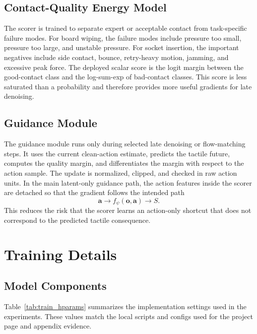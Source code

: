 \documentclass[10pt,letterpaper]{article}
\newcommand{\action}{\mathbf{a}}
\newcommand{\obs}{\mathbf{o}}
\newcommand{\score}{S}
\begin{document}
\subsection{Contact-Quality Energy Model}

The scorer is trained to separate expert or acceptable contact from
task-specific failure modes. For board wiping, the failure modes include
pressure too small, pressure too large, and unstable pressure. For socket
insertion, the important negatives include side contact, bounce, retry-heavy
motion, jamming, and excessive peak force. The deployed scalar score is the
logit margin between the good-contact class and the log-sum-exp of bad-contact
classes. This score is less saturated than a probability and therefore provides
more useful gradients for late denoising.

\subsection{Guidance Module}

The guidance module runs only during selected late denoising or flow-matching
steps. It uses the current clean-action estimate, predicts the tactile future,
computes the quality margin, and differentiates the margin with respect to the
action sample. The update is normalized, clipped, and checked in raw action
units. In the main latent-only guidance path, the action features inside the
scorer are detached so that the gradient follows the intended path
\[
\action \rightarrow f_\psi(\obs,\action) \rightarrow \score.
\]
This reduces the risk that the scorer learns an action-only shortcut that does
not correspond to the predicted tactile consequence.

\section{Training Details}
\label{sec:training}

\subsection{Model Components}

Table~\ref{tab:train_hparams} summarizes the implementation settings used in
the experiments. These values match the local scripts and configs used
for the project page and appendix evidence.
\end{document}
